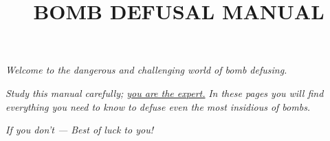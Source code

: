 \documentclass{../../ktane-mod}
\title{BOMB DEFUSAL MANUAL}
\author{}
\begin{document}
\maketitle
\thispagestyle{fancy}

\clearpage
\vspace*{\fill}
\begin{minipage}[c]{0.9\textwidth}
  \begin{center}
    \setlength{\parskip}{10pt}
    \textit{Welcome to the dangerous and challenging world of bomb defusing.}

    \textit{Study this manual carefully; \uline{you are the expert.}}
    \textit{In these pages you will find everything you need to know to defuse even the most insidious of bombs.}

    \textit{If you don't — Best of luck to you!}
  \end{center}
\end{minipage}
\vfill %
\clearpage
\end{document}
